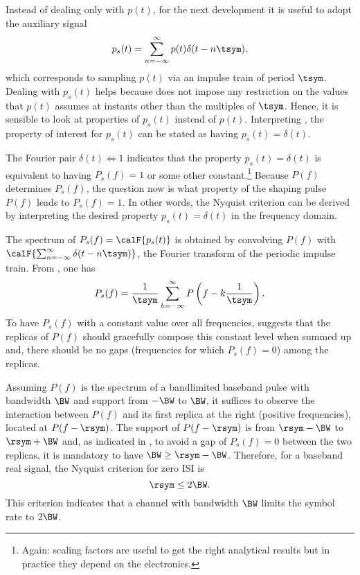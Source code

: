 Instead of dealing only with $p(t)$, for the next development it is useful to adopt the auxiliary signal 
\[
p_s(t) = \sum_{n=-\infty}^{\infty} p(t) \delta(t-n \tsym),
\]
which corresponds to sampling $p(t)$ via an impulse train of period $\tsym$.
Dealing with $p_s(t)$ helps because  does not impose any restriction on the values that $p(t)$ assumes at instants other than the multiples of $\tsym$. Hence, it is sensible to look at properties of $p_s(t)$ instead of $p(t)$.
Interpreting , the property of interest for $p_s(t)$ can be stated as having $p_s(t) = \delta(t)$. 

The Fourier pair $\delta(t) \Leftrightarrow 1$ indicates that the property $p_s(t) = \delta(t)$ is equivalent to having $P_s(f) = 1$ or some other constant.\footnote{Again: scaling factors are useful to get the right analytical results but in practice they depend on
the electronics.}
Because $P(f)$ determines $P_s(f)$, the question now is what property of the shaping
pulse $P(f)$ leads to $P_s(f) = 1$.
In other words, the Nyquist criterion can be derived by interpreting the desired property $p_s(t) = \delta(t)$ in the frequency domain. 

The spectrum of $P_s(f) = \calF \{ p_s(t) \}$ is obtained by convolving $P(f)$ with $\calF \{ \sum_{n=-\infty}^{\infty} \delta(t-n \tsym) \}$, the Fourier transform of the periodic impulse train. From , one has
\begin{equation}
P_s(f) = \frac{1}{\tsym} \sum_{k=-\infty}^{\infty} P \left( f - k \frac{1}{\tsym} \right).
\label{eq:nyquistCondition}
\end{equation}
To have $P_s(f)$ with a constant value over all frequencies, 
suggests that the replicas of $P(f)$ should gracefully compose this constant level when
summed up and, there should be no gaps (frequencies for which $P_s(f)=0$) among the 
replicas.

Assuming $P(f)$ is the spectrum of a bandlimited baseband pulse with bandwidth $\BW$
and support from $-\BW$ to $\BW$, 
it suffices to observe the interaction between $P(f)$ and its first replica at the right (positive frequencies),
located at $P(f-\rsym)$. The support of $P(f-\rsym)$ is from $\rsym-\BW$ to $\rsym+\BW$ and,
as indicated in , to avoid a gap of $P_s(f)=0$ between the two replicas, it is mandatory to have
$\BW \ge \rsym-\BW$. Therefore, for a baseband real signal, the Nyquist criterion for zero ISI is
\begin{equation}
\rsym \le 2 \BW.
\label{eq:nyquistZeroISI}
\end{equation}
This criterion indicates that a channel with bandwidth $\BW$ limits the symbol rate to $2 \BW$. 

